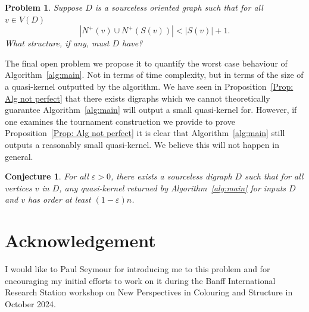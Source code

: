 \documentclass[12pt]{article}
\newtheorem{conjecture}[theorem]{Conjecture}
\newtheorem{problem}[theorem]{Problem}
\theoremstyle{definition}
\def\epsilon{\varepsilon}
\begin{document}
\begin{problem}
    Suppose $D$ is a sourceless oriented graph such that 
    for all $v \in V(D)$ 
    \[
    |N^+(v)\cup N^+(S(v))|< |S(v)|+1.
    \]
    What structure, if any, must $D$ have?
\end{problem}


The final open problem we propose
it to quantify the worst case behaviour of Algorithm~\ref{alg:main}.
Not in terms of time complexity, but in terms of the size of a quasi-kernel outputted by the algorithm.
We have seen in Proposition~\ref{Prop: Alg not perfect}
that there exists digraphs which we cannot theoretically guarantee
Algorithm~\ref{alg:main} will output a small quasi-kernel for.
However, if one examines the tournament construction we provide to prove 
Proposition~\ref{Prop: Alg not perfect} it is clear that 
Algorithm~\ref{alg:main} still outputs a reasonably small quasi-kernel.
We believe this will not happen in general.

\begin{conjecture}
    For all $\epsilon>0$, there exists a sourceless digraph $D$
    such that for all vertices $v$ in $D$, any quasi-kernel returned by Algorithm~\ref{alg:main}
    for inputs $D$ and $v$ has order at least $(1-\epsilon)n$.
\end{conjecture}

\section*{Acknowledgement}


I would like to Paul Seymour for introducing me to this problem and for encouraging my initial efforts to work on it
during the
Banff International Research Station workshop on New Perspectives in Colouring and Structure in October 2024.  



\end{document}
